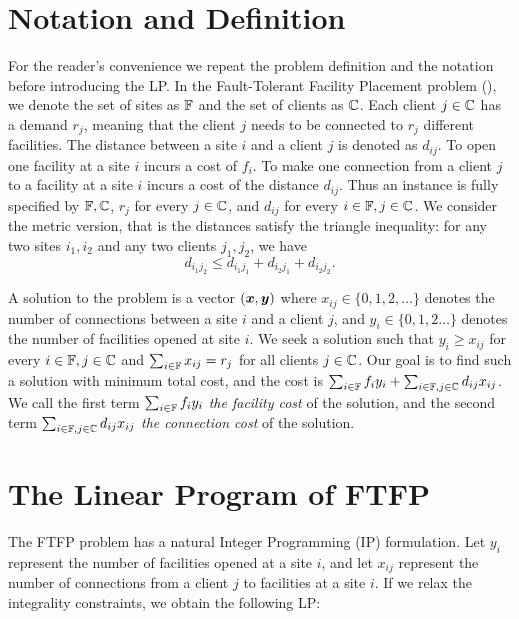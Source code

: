 \documentclass[oneside,final]{ucr}
\begin{document}
\section{Notation and Definition}
For the reader's convenience we repeat the problem
definition and the notation before introducing the LP. In
the Fault-Tolerant Facility Placement problem ({\FTFP}), we
denote the set of sites as $\mathbb{F}$ and the set of
clients as $\mathbb{C}$. Each client $j \in \mathbb{C}$ has
a demand $r_j$, meaning that the client $j$ needs to be
connected to $r_j$ different facilities. The distance
between a site $i$ and a client $j$ is denoted as
$d_{ij}$. To open one facility at a site $i$ incurs a cost
of $f_i$. To make one connection from a client $j$ to a
facility at a site $i$ incurs a cost of the distance
$d_{ij}$. Thus an {\FTFP} instance is fully specified by
$\mathbb{F}, \mathbb{C}$, $r_j$ for every $j\in\mathbb{C}$,
and $d_{ij}$ for every $i\in\mathbb{F},j\in\mathbb{C}$. We
consider the metric version, that is the distances satisfy
the triangle inequality: for any two sites $i_1,i_2$ and any
two clients $j_1,j_2$, we have
\begin{equation*}
  d_{i_1 j_2} \leq d_{i_1 j_1} + d_{i_2 j_1} + d_{i_2 j_2}.
\end{equation*} 

A solution to the {\FTFP} problem is a vector $(\boldsymbol{x}, \boldsymbol{y})$
where $x_{ij} \in \{0, 1, 2, \ldots\}$ denotes the number of
connections between a site $i$ and a client $j$, and $y_i
\in \{0, 1, 2\ldots\}$ denotes the number of facilities
opened at site $i$. We seek a solution such that $y_i \geq
x_{ij}$ for every $i \in \mathbb{F}, j \in \mathbb{C}$ and
$\sum_{i\in\mathbb{F}} x_{ij} = r_j$ for all clients $j \in
\mathbb{C}$. Our goal is to find such a solution with
minimum total cost, and the cost is $\sum_{i \in \mathbb{F}}
f_i y_i + \sum_{i \in \mathbb{F}, j \in \mathbb{C}} d_{ij}
x_{ij}$. We call the first term $\sum_{i \in \mathbb{F}} f_i
y_i$ \emph{the facility cost} of the solution, and the
second term $\sum_{i \in \mathbb{F}, j \in \mathbb{C}} d_{ij}
x_{ij}$ \emph{the connection cost} of the solution.

\section{The Linear Program of FTFP}
The FTFP problem has a natural Integer Programming (IP)
formulation. Let $y_i$ represent the number of facilities
opened at a site $i$, and let $x_{ij}$ represent the number
of connections from a client $j$ to facilities at a site
$i$. If we relax the integrality constraints, we obtain the
following LP:
\end{document}
